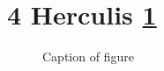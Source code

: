 \documentclass{article}
\begin{document}
\tableofcontents
\appendix
\section{4 Herculis \ref{fig.A.1}}
\begin{figure}
\caption{Caption of figure}
\label{fig.A.1}
\end{figure}
\end{document}
